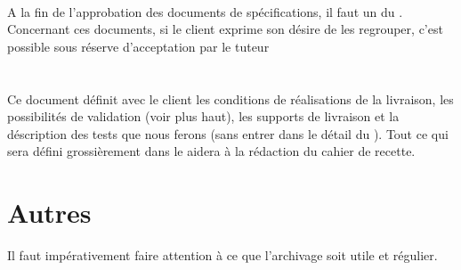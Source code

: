 \documentclass [a4paper] {article}
\begin{document}
~

A la fin de l'approbation des documents de spécifications, il faut un \PV{} du \CP{}. Concernant ces documents, si le client exprime son désire de les regrouper, c'est possible sous réserve d'acceptation par le tuteur 

\section{\PTV{}}
Ce document définit avec le client les conditions de réalisations de la livraison, les possibilités de validation (voir plus haut), les supports de livraison et la déscription des tests que nous ferons (sans entrer dans le détail du \CDR{}). Tout ce qui sera défini grossièrement dans le \PTV{} aidera à la rédaction du cahier de recette.

\section{Autres}
Il faut impérativement faire attention à ce que l'archivage soit utile et régulier.
\end{document}
